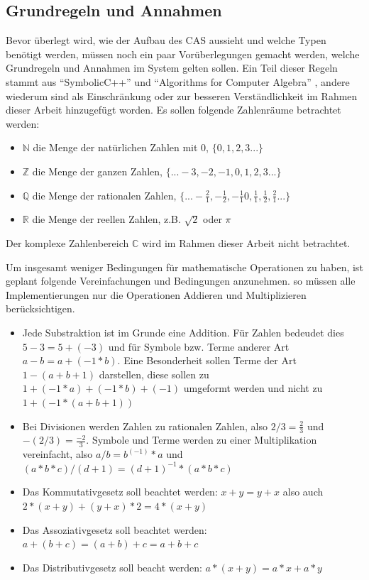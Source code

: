 \documentclass[11pt,a4paper, ngerman]{article}
\begin{document}
\subsection{Grundregeln und Annahmen}
Bevor überlegt wird, wie der Aufbau des CAS aussieht und welche Typen benötigt werden, müssen noch ein paar Vorüberlegungen gemacht werden, welche Grundregeln und Annahmen im System gelten sollen. Ein Teil dieser Regeln stammt aus ``SymbolicC++'' \cite[S. 2]{Tan2000} und ``Algorithms for Computer Algebra'' \cite[S. 23 ff.]{Geddes2007}, andere wiederum sind als Einschränkung oder zur besseren Verständlichkeit im Rahmen dieser Arbeit hinzugefügt worden. Es sollen folgende Zahlenräume betrachtet werden:
\begin{itemize}
    \item $\mathbb{N}$ die Menge der natürlichen Zahlen mit 0, $\{0, 1, 2, 3...\}$
    \item $\mathbb{Z}$ die Menge der ganzen Zahlen, $\{...-3, -2, -1, 0, 1, 2, 3...\}$
    \item $\mathbb{Q}$ die Menge der rationalen Zahlen, $\{...-\frac{2}{1}, -\frac{1}{2}, -\frac{1}{1} 0, \frac{1}{1}, \frac{1}{2}, \frac{2}{1}...\}$
    \item $\mathbb{R}$ die Menge der reellen Zahlen, z.B. $\sqrt{2}$ oder $\pi$
\end{itemize}

Der komplexe Zahlenbereich  $\mathbb{C}$ wird im Rahmen dieser Arbeit nicht betrachtet.

Um insgesamt weniger Bedingungen für mathematische Operationen zu haben, ist geplant folgende Vereinfachungen und Bedingungen anzunehmen. so müssen alle Implementierungen nur die Operationen Addieren und Multiplizieren berücksichtigen.
\begin{itemize}
    \item Jede Substraktion ist im Grunde eine Addition. Für Zahlen bedeudet dies $5-3 = 5+(-3)$ und für Symbole bzw. Terme anderer Art $a-b = a+(-1 * b)$. Eine Besonderheit sollen Terme der Art $1-(a+b+1)$ darstellen, diese sollen zu $1+(-1*a)+(-1*b)+(-1)$ umgeformt werden und nicht zu $1+(-1*(a+b+1))$
    \item Bei Divisionen werden Zahlen zu rationalen Zahlen, also $2/3 = \frac{2}{3}$ und $-(2/3) = \frac{-2}{3}$. Symbole und Terme werden zu einer Multiplikation vereinfacht, also $a/b = b^{(-1)} * a$ und $(a*b*c)/(d+1) = (d+1)^{-1} * (a*b*c)$
    \item Das Kommutativgesetz soll beachtet werden: $x+y = y+x$ also auch $2*(x+y) + (y+x)*2 = 4*(x+y)$
    \item Das Assoziativgesetz soll beachtet werden: $a+(b+c) = (a+b)+c = a+b+c$
    \item Das Distributivgesetz soll beacht werden: $a*(x+y) = a*x + a*y$
\end{itemize}
\end{document}
